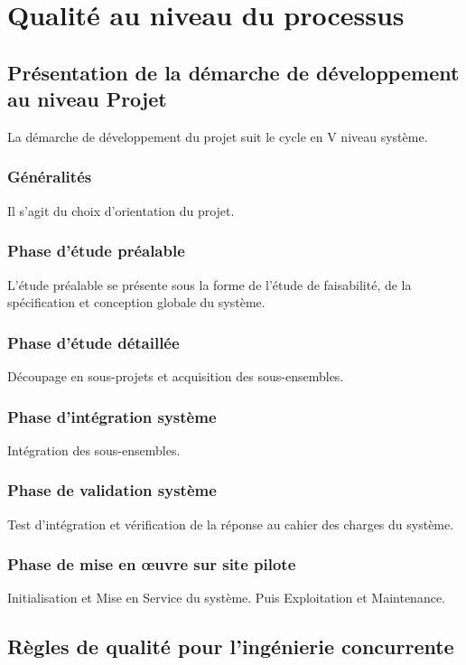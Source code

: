 
\section{Qualité au niveau du processus}

    \subsection{Présentation de la démarche de développement au niveau Projet}
    La démarche de développement du projet suit le cycle en V niveau système.

        \subsubsection{Généralités}
        Il s'agit du choix d'orientation du projet.
        \subsubsection{Phase d’étude préalable}
        L'étude préalable se présente sous la forme de l'étude de faisabilité, de 
la spécification et conception globale du système.
        \subsubsection{Phase d’étude détaillée}
        Découpage en sous-projets et acquisition des sous-ensembles.
        \subsubsection{Phase d’intégration système}
        Intégration des sous-ensembles.
        \subsubsection{Phase de validation système}
        Test d'intégration et vérification de la réponse au cahier des charges 
du système.
        \subsubsection{Phase de mise en \oe{}uvre sur site pilote}
        Initialisation et Mise en Service du système.
        Puis Exploitation et Maintenance.

    \subsection{Règles de qualité pour l’ingénierie concurrente}

